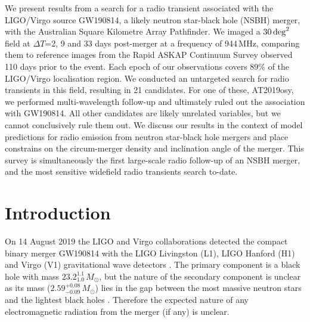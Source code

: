 
\endgroup

We present results from a search for a radio transient associated with the LIGO/Virgo source GW190814, a likely neutron star-black hole (NSBH) merger, with the Australian Square Kilometre Array Pathfinder. We imaged a $30\,{\rm deg}^2$ field at $\Delta T$=2, 9 and 33 days post-merger at a frequency of 944\,MHz, comparing them to reference images from the Rapid ASKAP Continuum Survey observed 110 days prior to the event. Each epoch of our observations covers $89\%$ of the LIGO/Virgo localisation region. We conducted an untargeted search for radio transients in this field, resulting in 21 candidates. For one of these, AT2019osy, we performed multi-wavelength follow-up and ultimately ruled out the association with GW190814. All other candidates are likely unrelated variables, but we cannot conclusively rule them out. We discuss our results in the context of model predictions for radio emission from neutron star-black hole mergers and place constrains on the circum-merger density and inclination angle of the merger. This survey is simultaneously the first large-scale radio follow-up of an NSBH merger, and the most sensitive widefield radio transients search to-date.

\clearpage
\pagebreak

\section{Introduction}
On 14 August 2019 the LIGO and Virgo collaborations detected the compact binary merger GW190814 with the LIGO Livingston (L1), LIGO Hanford (H1) and Virgo (V1) gravitational wave detectors \citep{2020ApJ...896L..44A}. The primary component is a black hole with mass $23.2_{1.0}^{1.1}\,M_\odot$, but the nature of the secondary component is unclear as its mass ($2.59_{-0.09}^{+0.08}\,M_\odot$) lies in the gap between the most massive neutron stars and the lightest black holes \citep{2011ApJ...741..103F,2012ApJ...757...55O,2019MNRAS.488.5020Z,2019NatAs.tmp..439C}. Therefore the expected nature of any electromagnetic radiation from the merger (if any) is unclear.

